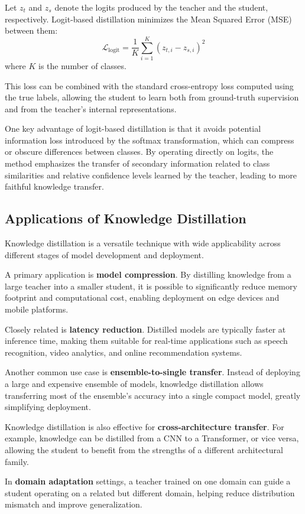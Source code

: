 Let $z_t$ and $z_s$ denote the logits produced by the teacher and the student, respectively.
Logit-based distillation minimizes the Mean Squared Error (MSE) between them:
\[
\mathcal{L}_{\text{logit}} = \frac{1}{K} \sum_{i=1}^{K} (z_{t,i} - z_{s,i})^2
\]
where $K$ is the number of classes.

This loss can be combined with the standard cross-entropy loss computed using the true labels,
allowing the student to learn both from ground-truth supervision and from the teacher’s
internal representations.

One key advantage of logit-based distillation is that it avoids potential information loss
introduced by the softmax transformation, which can compress or obscure differences between
classes. By operating directly on logits, the method emphasizes the transfer of secondary
information related to class similarities and relative confidence levels learned by the
teacher, leading to more faithful knowledge transfer.

\subsection{Applications of Knowledge Distillation}
Knowledge distillation is a versatile technique with wide applicability across different stages
of model development and deployment.

A primary application is \textbf{model compression}. By distilling knowledge from a large
teacher into a smaller student, it is possible to significantly reduce memory footprint and
computational cost, enabling deployment on edge devices and mobile platforms.

Closely related is \textbf{latency reduction}. Distilled models are typically faster at
inference time, making them suitable for real-time applications such as speech recognition,
video analytics, and online recommendation systems.

Another common use case is \textbf{ensemble-to-single transfer}. Instead of deploying a large
and expensive ensemble of models, knowledge distillation allows transferring most of the
ensemble’s accuracy into a single compact model, greatly simplifying deployment.

Knowledge distillation is also effective for \textbf{cross-architecture transfer}. For example,
knowledge can be distilled from a CNN to a Transformer, or vice versa, allowing the student to
benefit from the strengths of a different architectural family.

In \textbf{domain adaptation} settings, a teacher trained on one domain can guide a student
operating on a related but different domain, helping reduce distribution mismatch and improve
generalization.

